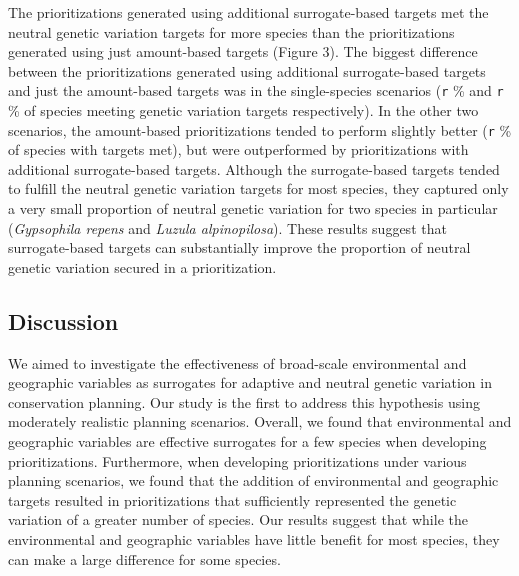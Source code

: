 \documentclass[11pt,]{article}
\begin{document}
The prioritizations generated using additional surrogate-based targets
met the neutral genetic variation targets for more species than the
prioritizations generated using just amount-based targets (Figure 3).
The biggest difference between the prioritizations generated using
additional surrogate-based targets and just the amount-based targets was
in the single-species scenarios (\texttt{r} \% and \texttt{r} \% of
species meeting genetic variation targets respectively). In the other
two scenarios, the amount-based prioritizations tended to perform
slightly better (\texttt{r} \% of species with targets met), but were
outperformed by prioritizations with additional surrogate-based targets.
Although the surrogate-based targets tended to fulfill the neutral
genetic variation targets for most species, they captured only a very
small proportion of neutral genetic variation for two species in
particular (\emph{Gypsophila repens} and \emph{Luzula alpinopilosa}).
These results suggest that surrogate-based targets can substantially
improve the proportion of neutral genetic variation secured in a
prioritization.

\subsection{Discussion}\label{discussion}

We aimed to investigate the effectiveness of broad-scale environmental
and geographic variables as surrogates for adaptive and neutral genetic
variation in conservation planning. Our study is the first to address
this hypothesis using moderately realistic planning scenarios. Overall,
we found that environmental and geographic variables are effective
surrogates for a few species when developing prioritizations.
Furthermore, when developing prioritizations under various planning
scenarios, we found that the addition of environmental and geographic
targets resulted in prioritizations that sufficiently represented the
genetic variation of a greater number of species. Our results suggest
that while the environmental and geographic variables have little
benefit for most species, they can make a large difference for some
species.
\end{document}
